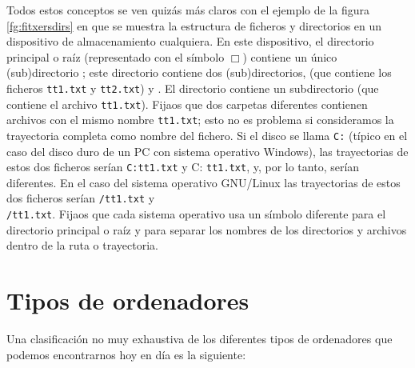 Todos estos conceptos se ven quizás más claros con el ejemplo de la
figura \ref{fg:fitxersdirs} en que se muestra la estructura de
ficheros y directorios en un dispositivo de almacenamiento
cualquiera. En este dispositivo, el directorio principal o raíz
(representado con el símbolo $\Box$) contiene un único (sub)directorio
; este directorio contiene dos (sub)directorios, 
(que contiene los ficheros \texttt{tt1.txt} y \texttt{tt2.txt}) y
. El directorio  contiene un subdirectorio
 (que contiene el archivo \texttt{tt1.txt}). Fijaos que dos
carpetas diferentes contienen archivos con el mismo nombre
\texttt{tt1.txt}; esto no es problema si consideramos la trayectoria
completa como nombre del fichero. Si el disco se llama \texttt{C:}
(típico en el caso del disco duro de un PC con sistema operativo
Windows), las trayectorias de estos dos ficheros serían
\texttt{C:}\barra{}\barra{}\barra\texttt{tt1.txt} y
C:
\texttt{}\barra{}\barra{}\barra{}\barra\texttt{tt1.txt},
y, por lo tanto, serían diferentes. En el caso del sistema operativo
GNU/Linux las trayectorias de estos dos ficheros serían
\texttt{/}\texttt{tt1.txt} y \\
\texttt{/}\texttt{tt1.txt}. Fijaos
que cada sistema operativo usa un símbolo diferente para el directorio
principal o raíz y para separar los nombres de los directorios y
archivos dentro de la ruta o trayectoria.

\section{Tipos de ordenadores} Una clasificación no muy exhaustiva de los diferentes tipos de ordenadores que podemos encontrarnos hoy en día es la siguiente: 

